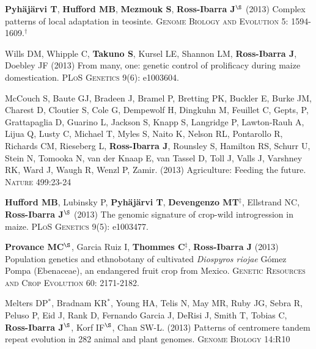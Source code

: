 \documentclass[letterpaper]{article}
\begin{document}
\begin{etaremune}
\item {\bf Pyh\"aj\"arvi T}, {\bf Hufford MB}, {\bf Mezmouk S}, {\bf Ross-Ibarra J}$^\S$ (2013) Complex patterns of local adaptation in teosinte. \textsc{Genome Biology and Evolution} 5: 1594-1609.$^\dagger$

\item Wills DM, Whipple C, {\bf Takuno S}, Kursel LE, Shannon LM, {\bf Ross-Ibarra J}, Doebley JF (2013) From many, one: genetic control of prolificacy during maize domestication. \textsc{PLoS Genetics} 9(6): e1003604. %

\item McCouch S, Baute GJ, Bradeen J, Bramel P, Bretting PK, Buckler E, Burke JM, Charest D, Cloutier S, Cole G, Dempewolf H, Dingkuhn M, Feuillet C, Gepts, P, Grattapaglia D, Guarino L, Jackson S, Knapp S, Langridge P, Lawton-Rauh A, Lijua Q, Lusty C, Michael T, Myles S, Naito K, Nelson RL, Pontarollo R, Richards CM, Rieseberg L, {\bf Ross-Ibarra J}, Rounsley S, Hamilton RS, Schurr U, Stein N, Tomooka N, van der Knaap E, van Tassel D, Toll J, Valls J, Varshney RK, Ward J, Waugh R, Wenzl P, Zamir. (2013) Agriculture: Feeding the future. \textsc{Nature} 499:23-24

\item {\bf Hufford MB}, Lubinsky P, {\bf Pyh\"aj\"arvi T}, {\bf Devengenzo MT}$^\ddagger$, Ellstrand NC, {\bf Ross-Ibarra J}$^\S$ (2013) The genomic signature of crop-wild introgression in maize. \textsc{PLoS Genetics} 9(5): e1003477. %

\item {\bf Provance MC}$^\S$, Garcia Ruiz I, {\bf Thommes C}$^\ddagger$, {\bf Ross-Ibarra J} (2013) Population genetics and ethnobotany of cultivated \emph{Diospyros riojae} G\'omez Pompa (Ebenaceae), an endangered fruit crop from Mexico. \textsc{Genetic Resources and Crop Evolution} 60: 2171-2182.

\item Melters DP$^*$, Bradnam KR$^*$, Young HA, Telis N, May MR, Ruby JG, Sebra R, Peluso P, Eid J, Rank D, Fernando Garcia J, DeRisi J, Smith T, Tobias C, {\bf Ross-Ibarra J}$^\S$, Korf IF$^\S$, Chan SW-L. (2013) Patterns of centromere tandem repeat evolution in 282 animal and plant genomes. \textsc{Genome Biology} 14:R10 


\end{etaremune}
\end{document}
